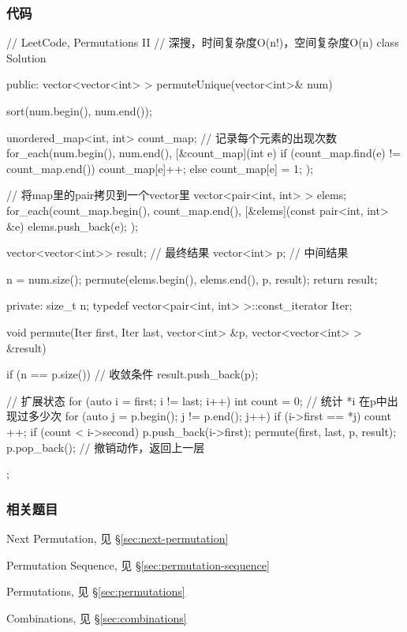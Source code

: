 \subsubsection{代码}
\begin{Code}
// LeetCode, Permutations II
// 深搜，时间复杂度O(n!)，空间复杂度O(n)
class Solution {
public:
    vector<vector<int> > permuteUnique(vector<int>& num) {
        sort(num.begin(), num.end());

        unordered_map<int, int> count_map; // 记录每个元素的出现次数
        for_each(num.begin(), num.end(), [&count_map](int e) {
            if (count_map.find(e) != count_map.end())
                count_map[e]++;
            else
                count_map[e] = 1;
        });

        // 将map里的pair拷贝到一个vector里
        vector<pair<int, int> > elems;
        for_each(count_map.begin(), count_map.end(),
                [&elems](const pair<int, int> &e) {
                    elems.push_back(e);
                });

        vector<vector<int>> result; // 最终结果
        vector<int> p;  // 中间结果

        n = num.size();
        permute(elems.begin(), elems.end(), p, result);
        return result;
    }

private:
    size_t n;
    typedef vector<pair<int, int> >::const_iterator Iter;

    void permute(Iter first, Iter last, vector<int> &p,
            vector<vector<int> > &result) {
        if (n == p.size()) {  // 收敛条件
            result.push_back(p);
        }

        // 扩展状态
        for (auto i = first; i != last; i++) {
            int count = 0; // 统计 *i 在p中出现过多少次
            for (auto j = p.begin(); j != p.end(); j++) {
                if (i->first == *j) {
                    count ++;
                }
            }
            if (count < i->second) {
                p.push_back(i->first);
                permute(first, last, p, result);
                p.pop_back(); // 撤销动作，返回上一层
            }
        }
    }
};
\end{Code}


\subsubsection{相关题目}
\begindot
\item Next Permutation, 见 \S \ref{sec:next-permutation}
\item Permutation Sequence, 见 \S \ref{sec:permutation-sequence}
\item Permutations, 见 \S \ref{sec:permutations}
\item Combinations, 见 \S \ref{sec:combinations}
\myenddot


